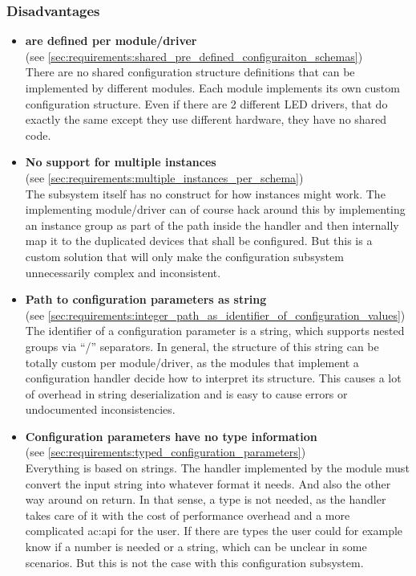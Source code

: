 \subsubsection{Disadvantages}

\begin{itemize}
      \item \textbf{ are defined per module/driver}\\
            (see \autoref{sec:requirements:shared_pre_defined_configuraiton_schemas})\\
            There are no shared configuration structure definitions that can be implemented by different modules.
            Each module implements its own custom configuration structure.
            Even if there are 2 different LED drivers, that do exactly the same except they use different hardware, they have no shared code.

      \item \textbf{No support for multiple instances}\\
            (see \autoref{sec:requirements:multiple_instances_per_schema})\\
            The subsystem itself has no construct for how instances might work.
            The implementing module/driver can of course hack around this by implementing an instance group as part of the path inside the handler and then internally map it to the duplicated devices that shall be configured.
            But this is a custom solution that will only make the configuration subsystem unnecessarily complex and inconsistent.

      \item \textbf{Path to configuration parameters as string}\\
            (see \autoref{sec:requirements:integer_path_as_identifier_of_configuration_values})\\
            The identifier of a configuration parameter is a string, which supports nested groups via ``/'' separators.
            In general, the structure of this string can be totally custom per module/driver, as the modules that implement a configuration handler decide how to interpret its structure.
            This causes a lot of overhead in string deserialization and is easy to cause errors or undocumented inconsistencies.

      \item \textbf{Configuration parameters have no type information}\\
            (see \autoref{sec:requirements:typed_configuration_parameters})\\
            Everything is based on strings.
            The handler implemented by the module must convert the input string into whatever format it needs.
            And also the other way around on return.
            In that sense, a type is not needed, as the handler takes care of it with the cost of performance overhead and a more complicated \gls{ac:api} for the user.
            If there are types the user could for example know if a number is needed or a string, which can be unclear in some scenarios.
            But this is not the case with this configuration subsystem.


\end{itemize}
